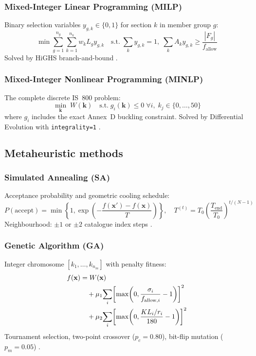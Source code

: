\documentclass[lineno,pdflatex,sn-mathphys-num]{sn-jnl}
\begin{document}
\subsubsection{Mixed-Integer Linear Programming (MILP)}
Binary selection variables $y_{g,k}\in\{0,1\}$ for section $k$ in
member group $g$:
\begin{equation}
  \min \sum_{g=1}^{n_g}\sum_{k=1}^{n_k} w_k L_g y_{g,k}
  \quad\text{s.t.}\;
  \sum_k y_{g,k}=1,\;
  \sum_k A_k y_{g,k}\geq \frac{|F_g|}{f_{\mathrm{allow}}}
  \label{eq:milp}
\end{equation}
Solved by HiGHS branch-and-bound \citep{Huangfu2018}.

\subsubsection{Mixed-Integer Nonlinear Programming (MINLP)}
The complete discrete IS~800 problem:
\begin{equation}
  \min_{\mathbf{k}}\;W(\mathbf{k})
  \quad\text{s.t.}\;g_i(\mathbf{k})\leq 0\;\forall i,\;
  k_j\in\{0,\ldots,50\}
  \label{eq:minlp}
\end{equation}
where $g_i$ includes the exact Annex~D buckling constraint.
Solved by Differential Evolution with \texttt{integrality=1}
\citep{Virtanen2020}.

\subsection{Metaheuristic methods}

\subsubsection{Simulated Annealing (SA)}
Acceptance probability and geometric cooling schedule:
\begin{equation}
  P(\text{accept}) = \min\!\left\{1,\exp\!\left(
    -\frac{f(\mathbf{x}')-f(\mathbf{x})}{T}\right)\right\},
  \quad
  T^{(t)} = T_0\!\left(\frac{T_{\mathrm{end}}}{T_0}\right)^{t/(N-1)}
  \label{eq:sa}
\end{equation}
Neighbourhood: $\pm 1$ or $\pm 2$ catalogue index steps
\citep{Kirkpatrick1983}.

\subsubsection{Genetic Algorithm (GA)}
Integer chromosome $[k_1,\ldots,k_{n_m}]$ with penalty fitness:
\begin{align}
  f(\mathbf{x}) &= W(\mathbf{x}) \notag\\
    &\quad + \mu_1\!\sum_i\!\left[\max\!\left(0,
        \frac{\sigma_i}{f_{\mathrm{allow},i}}-1\right)\right]^2 \notag\\
    &\quad + \mu_2\!\sum_i\!\left[\max\!\left(0,
        \frac{KL_i/r_i}{180}-1\right)\right]^2
  \label{eq:ga_fitness}
\end{align}
Tournament selection, two-point crossover ($p_c=0.80$), bit-flip
mutation ($p_m=0.05$) \citep{Shallan2014}.
\end{document}
